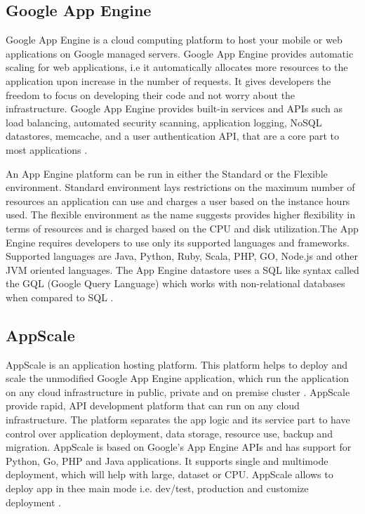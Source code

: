 \subsection{Google App Engine}

    Google App Engine is a cloud computing platform to host your
    mobile or web applications on Google managed servers. Google App
    Engine provides automatic scaling for web applications, i.e it
    automatically allocates more resources to the application upon
    increase in the number of requests. It gives developers the
    freedom to focus on developing their code and not worry about the
    infrastructure. Google App Engine provides built-in services and
    APIs such as load balancing, automated security scanning,
    application logging, NoSQL datastores, memcache, and a user
    authentication API, that are a core part to most
    applications \cite{www-appengine-google}.
     
    An App Engine platform can be run in either the Standard or the
    Flexible environment. Standard environment lays restrictions on
    the maximum number of resources an application can use and charges
    a user based on the instance hours used. The flexible environment
    as the name suggests provides higher flexibility in terms of
    resources and is charged based on the CPU and disk utilization.The
    App Engine requires developers to use only its supported languages
    and frameworks. Supported languages are Java, Python, Ruby, Scala,
    PHP, GO, Node.js and other JVM oriented languages. The App Engine
    datastore uses a SQL like syntax called the GQL (Google Query
    Language) which works with non-relational databases when compared
    to SQL \cite{www-wiki-appengine}.
    
\subsection{AppScale}

    AppScale is an application hosting platform. This platform helps
    to deploy and scale the unmodified Google App Engine application,
    which run the application on any cloud infrastructure in public,
    private and on premise cluster \cite{www-appscale}. AppScale
    provide rapid, API development platform that can run on any cloud
    infrastructure. The platform separates the app logic and its
    service part to have control over application deployment, data
    storage, resource use, backup and migration.  AppScale is based on
    Google’s App Engine APIs and has support for Python, Go, PHP and
    Java applications. It supports single and multimode deployment,
    which will help with large, dataset or CPU. AppScale allows to
    deploy app in thee main mode i.e. dev/test, production and
    customize deployment \cite{www-appscale-deployment}.

